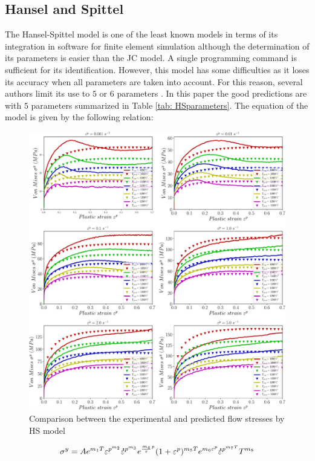 \documentclass[twoside,english,1p,final,sort&compress]{elsarticle}
\theoremstyle{plain}
\newcommand{\mdot}[1]{\accentset{\mbox{\bfseries .}}{#1}}
\begin{document}
\subsection{Hansel and Spittel\label{sec:HSmodel}}
The Hansel-Spittel model is one of the least known models in terms of its  integration in software for finite element simulation although the determination of its parameters is easier than the JC model. A single programming command is sufficient for its identification. However, this model has some difficulties as it loses its accuracy when all parameters are taken into account. For this reason, several authors limit its use to $5$ or $6$ parameters \cite{Chadha-2018, Rudnytskyj-2020, Mehtedi-2015}. In this paper the good predictions are with $5$ parameters summarized in Table \ref{tab: HSparameters}. The equation of the model is given by the following relation:
\begin{figure}[!ht]
\centering
\includegraphics[width=1.02\columnwidth]
{Figures/CompExpHS}
\caption{Comparison between the experimental and predicted flow stresses by HS model}
\label{fig:iCorrelationHS}
\end{figure}
\begin{equation}
\sigma^y = Ae^{m_1T}\varepsilon^{p^{m_2}}\mdot\varepsilon^{p^{m_3}}e^{\frac{m_4}\varepsilon^p}(1+\varepsilon^p)^{m_5T}e^{m_6\varepsilon^p}\mdot\varepsilon^{p^{m_7T}}T^{m_8}
\end{equation}
\end{document}
